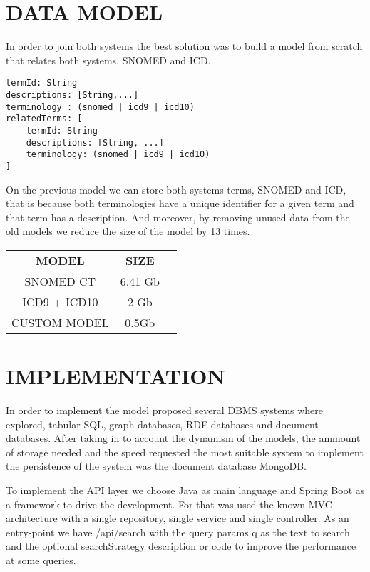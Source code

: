 \documentclass[letterpaper, 10 pt, conference]{ieeeconf}  %
\begin{document}
\section{DATA MODEL}
In order to join both systems the best solution was to build a model from scratch that relates both systems, SNOMED and ICD.
\begin{lstlisting}
termId: String
descriptions: [String,...]
terminology : (snomed | icd9 | icd10)
relatedTerms: [
    termId: String
    descriptions: [String, ...]
    terminology: (snomed | icd9 | icd10)
]
\end{lstlisting}

On the previous model we can store both systems terms, SNOMED and ICD, that is because both terminologies have a unique identifier for a given term and that term has a description. And moreover, by removing unused data from the old models we reduce the size of the model by 13 times. 
\begin{center}
\begin{tabular}{|c|c|c}
\cline{1-2}
\textbf{MODEL} & \textbf{SIZE}  \\ \cline{1-2}
SNOMED CT      & 6.41 Gb        \\ \cline{1-2}
ICD9 + ICD10   & 2 Gb           \\ \cline{1-2}
CUSTOM MODEL   & 0.5Gb          \\ \cline{1-2}
\end{tabular}
\end{center}

\section{IMPLEMENTATION}
In order to implement the model proposed several DBMS systems where explored, tabular SQL, graph databases, RDF databases and document databases. After taking in to account the dynamism of the models, the ammount of storage needed and the speed requested the most suitable system to implement the persistence of the system was the document database MongoDB.

To implement the API layer we choose Java as main language and Spring Boot as a framework to drive the development. For that was used the known MVC architecture with a single repository, single service and single controller. As an entry-point we have /api/search with the query params q as the text to search and the optional searchStrategy description or code to improve the performance at some queries.

\addtolength{\textheight}{-12cm}   %
\end{document}

